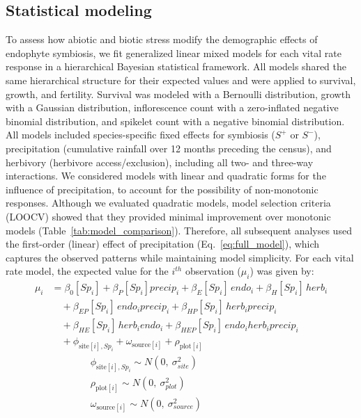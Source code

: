 \documentclass[12pt]{article}\usepackage[]{graphicx}\usepackage[dvipsnames]{xcolor}
\begin{document}
\subsection*{Statistical modeling}
To assess how abiotic and biotic stress modify the demographic effects of endophyte symbiosis, we fit generalized linear mixed models for each vital rate response in a hierarchical Bayesian statistical framework. %
All models shared the same hierarchical structure for their expected values and were applied to survival, growth, and fertility.
Survival was modeled with a Bernoulli distribution, growth with a Gaussian distribution, inflorescence count with a zero-inflated negative binomial distribution, and spikelet count with a negative binomial distribution.
All models included species-specific fixed effects for symbiosis ($S^+$ or $S^-$), precipitation (cumulative rainfall over 12 months preceding the census), and herbivory (herbivore access/exclusion), including all two- and three-way interactions. 
We considered models with linear and quadratic forms for the influence of precipitation, to account for the possibility of non-monotonic responses. 
Although we evaluated quadratic models, model selection criteria (LOOCV) showed that they provided minimal improvement over monotonic models (Table~\ref{tab:model_comparison}). 
Therefore, all subsequent analyses used the first-order (linear) effect of precipitation (Eq.~\ref{eq:full_model}), which captures the observed patterns while maintaining model simplicity.
For each vital rate model, the expected value for the $i^{th}$ observation ($\mu_{i}$) was given by:
\begin{equation}\label{eq:full_model}
\begin{aligned}
\mu_i &= \beta_0[Sp_i] + \beta_P[Sp_i] precip_i + \beta_{E}[Sp_i]\, endo_i + \beta_{H}[Sp_i]\, herb_i \\
&\quad + \beta_{EP}[Sp_i]\, endo_i precip_i 
       + \beta_{HP}[Sp_i]\, herb_i precip_i \\
&\quad + \beta_{HE}[Sp_i]\, herb_i endo_i + \beta_{HEP}[Sp_i]\, endo_i herb_i precip_i \\
&\quad  + \phi_{\text{site}[i],Sp_i} 
       + \omega_{\text{source}[i]} 
       + \rho_{\text{plot}[i]}
       \\
&\quad \quad \quad \quad \phi_{\text{site}[i],Sp_i} \sim N(0,\ \sigma^2_{site})\\
&\quad \quad \quad \quad \rho_{\text{plot}[i]} \sim N(0,\ \sigma^2_{plot})\\
&\quad \quad \quad \quad \omega_{\text{source}[i]} \sim N(0,\ \sigma^2_{source})
\end{aligned}
\end{equation}
\end{document}
